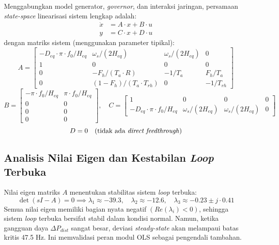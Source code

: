 Menggabungkan model generator, \textit{governor}, dan interaksi jaringan, persamaan \textit{state-space} linearisasi sistem lengkap adalah:
\begin{equation}
    \begin{aligned}
        \dot{x} &= A\cdot x + B\cdot u \\
        y &= C\cdot x + D\cdot u
    \end{aligned}
\end{equation}
dengan matriks sistem (menggunakan parameter tipikal):
\begin{equation}
    A = \begin{bmatrix}
        -D_{eq}\cdot\pi\cdot f_{0}/H_{eq} & \omega_{s}/(2H_{eq}) & \omega_{s}/(2H_{eq}) & 0 \\
        1 & 0 & 0 & 0 \\
        0 & -F_{h}/(T_{a}\cdot R) & -1/T_{a} & F_{h}/T_{a} \\
        0 & (1-F_{h})/(T_{a}\cdot T_{rh}) & 0 & -1/T_{rh}
    \end{bmatrix}
\end{equation}
\begin{equation}
    B = \begin{bmatrix}
        -\pi\cdot f_{0}/H_{eq} & \pi\cdot f_{0}/H_{eq} \\
        0 & 0 \\
        0 & 0 \\
        0 & 0
    \end{bmatrix}, \quad
    C = \begin{bmatrix}
        1 & 0 & 0 & 0 \\
        -D_{eq}\cdot\pi\cdot f_{0}/H_{eq} & \omega_{s}/(2H_{eq}) & \omega_{s}/(2H_{eq}) & 0
    \end{bmatrix}
\end{equation}
\begin{equation}
    D = 0 \quad \text{(tidak ada \textit{direct feedthrough})}
\end{equation}

\subsection{Analisis Nilai Eigen dan Kestabilan \textit{Loop} Terbuka}
\label{subsec:Analisis_Nilai_Eigen}

Nilai eigen matriks $A$ menentukan stabilitas sistem \textit{loop} terbuka:
\begin{equation}
    \det(sI-A) = 0 \implies \lambda_{1} \approx -39.3, \quad \lambda_{2} \approx -12.6, \quad \lambda_{3} \approx -0.23 \pm j\cdot 0.41
\end{equation}
Semua nilai eigen memiliki bagian nyata negatif $(Re(\lambda_{i})<0)$, sehingga sistem \textit{loop} terbuka bersifat stabil dalam kondisi normal. Namun, ketika gangguan daya $\Delta P_{dist}$ sangat besar, deviasi \textit{steady-state} akan melampaui batas kritis 47.5 Hz. Ini memvalidasi peran modul OLS sebagai pengendali tambahan.

